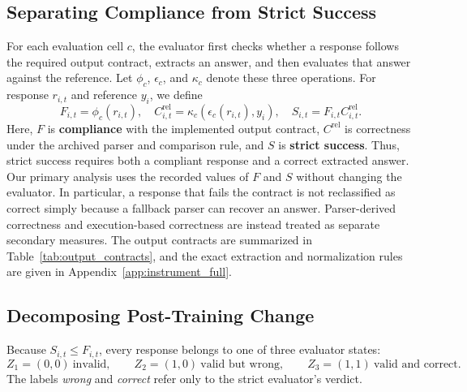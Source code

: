 \documentclass{article}
\begin{document}
\subsection{Separating Compliance from Strict Success}
\label{sec:strict_definition}
\vspace{-1mm}
For each evaluation cell \(c\), the evaluator first checks whether a response follows the required output contract, extracts an answer, and then evaluates that answer against the reference. Let \(\phi_c\), \(\epsilon_c\), and \(\kappa_c\) denote these three operations. For response \(r_{i,t}\) and reference \(y_i\), we define
\begin{equation}
F_{i,t} = \phi_c(r_{i,t}), \quad
C^{\mathrm{rel}}_{i,t}
= \kappa_c\!\left(\epsilon_c(r_{i,t}),y_i\right), \quad
S_{i,t} = F_{i,t}C^{\mathrm{rel}}_{i,t}.
\label{eq:identity}
\end{equation}
Here, \(F\) is \textbf{compliance} with the implemented output contract, \(C^{\mathrm{rel}}\) is correctness under the archived parser and comparison rule, and \(S\) is \textbf{strict success}. Thus, strict success requires both a compliant response and a correct extracted answer.
\\
Our primary analysis uses the recorded values of \(F\) and \(S\) without changing the evaluator. In particular, a response that fails the contract is not reclassified as correct simply because a fallback parser can recover an answer. Parser-derived correctness and execution-based correctness are instead treated as separate secondary measures. The output contracts are summarized in Table~\ref{tab:output_contracts}, and the exact extraction and normalization rules are given in Appendix~\ref{app:instrument_full}.




\vspace{-2mm}
\subsection{Decomposing Post-Training Change}
\label{sec:decomposition}
\vspace{-1mm}
Because \(S_{i,t}\leq F_{i,t}\), every response belongs to one of three evaluator states:
\begin{equation}
Z_1=(0,0)\ \text{invalid}, \qquad
Z_2=(1,0)\ \text{valid but wrong}, \qquad
Z_3=(1,1)\ \text{valid and correct}.
\label{eq:zstates}
\end{equation}
The labels \emph{wrong} and \emph{correct} refer only to the strict evaluator's verdict.
\end{document}
